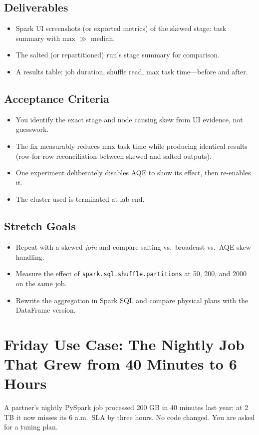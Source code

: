 \subsection*{Deliverables}
\begin{itemize}
    \item Spark UI screenshots (or exported metrics) of the skewed stage: task summary with max $\gg$ median.
    \item The salted (or repartitioned) run's stage summary for comparison.
    \item A results table: job duration, shuffle read, max task time---before and after.
\end{itemize}

\subsection*{Acceptance Criteria}
\begin{itemize}
    \item You identify the exact stage and node causing skew from UI evidence, not guesswork.
    \item The fix measurably reduces max task time while producing identical results (row-for-row reconciliation between skewed and salted outputs).
    \item One experiment deliberately disables AQE to show its effect, then re-enables it.
    \item The cluster used is terminated at lab end.
\end{itemize}

\subsection*{Stretch Goals}
\begin{itemize}
    \item Repeat with a skewed \emph{join} and compare salting vs.\ broadcast vs.\ AQE skew handling.
    \item Measure the effect of \texttt{spark.sql.shuffle.partitions} at 50, 200, and 2000 on the same job.
    \item Rewrite the aggregation in Spark SQL and compare physical plans with the DataFrame version.
\end{itemize}

\section{Friday Use Case: The Nightly Job That Grew from 40 Minutes to 6 Hours}
A partner's nightly PySpark job processed 200 GB in 40 minutes last year; at 2 TB it now misses its 6 a.m.\ SLA by three hours. No code changed. You are asked for a tuning plan.

